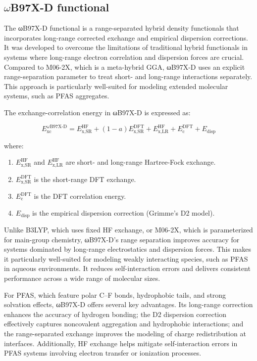 \subsection{$\omega$B97X-D functional}

The ωB97X-D functional is a range-separated hybrid density functionals that incorporates long-range corrected exchange and empirical dispersion corrections. It was developed to overcome the limitations of traditional hybrid functionals in systems where long-range electron correlation and dispersion forces are crucial. Compared to M06-2X, which is a meta-hybrid GGA, ωB97X-D uses an explicit range-separation parameter to treat short- and long-range interactions separately. This approach is particularly well-suited for modeling extended molecular systems, such as PFAS aggregates. 

The exchange-correlation energy in ωB97X-D is expressed as: 

\begin{equation}
    E_{\text{xc}}^{\omega\text{B97X-D}} = E_{\text{x,SR}}^{\text{HF}} + (1 - a)E_{\text{x,SR}}^{\text{DFT}} + E_{\text{x,LR}}^{\text{HF}} + E_{\text{c}}^{\text{DFT}} + E_{\text{disp}}
\end{equation}

where:
\begin{enumerate}
  \item $E_{\text{x,SR}}^{\text{HF}}$ and $E_{\text{x,LR}}^{\text{HF}}$ are short- and long-range Hartree-Fock exchange.
  \item $E_{\text{x,SR}}^{\text{DFT}}$ is the short-range DFT exchange.
  \item $E_{\text{c}}^{\text{DFT}}$ is the DFT correlation energy.
  \item $E_{\text{disp}}$ is the empirical dispersion correction (Grimme's D2 model).
\end{enumerate}

Unlike B3LYP, which uses fixed HF exchange, or M06-2X, which is parameterized for main-group chemistry, ωB97X-D’s range separation improves accuracy for systems dominated by long-range electrostatics and dispersion forces. This makes it particularly well-suited for modeling weakly interacting species, such as PFAS in aqueous environments. It reduces self-interaction errors and delivers consistent performance across a wide range of molecular sizes. 

For PFAS, which feature polar C–F bonds, hydrophobic tails, and strong solvation effects, ωB97X-D offers several key advantages. Its long-range correction enhances the accuracy of hydrogen bonding; the D2 dispersion correction effectively captures noncovalent aggregation and hydrophobic interactions; and the range-separated exchange improves the modeling of charge redistribution at interfaces. Additionally, HF exchange helps mitigate self-interaction errors in PFAS systems involving electron transfer or ionization processes. 

